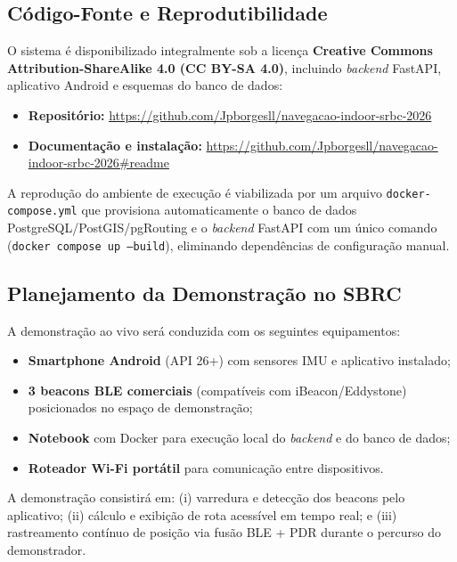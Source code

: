 \documentclass[12pt]{article}
\begin{document}
\subsection{Código-Fonte e Reprodutibilidade}

O sistema é disponibilizado integralmente sob a licença
\textbf{Creative Commons Attribution-ShareAlike 4.0 (CC BY-SA 4.0)},
incluindo \textit{backend} FastAPI, aplicativo Android e esquemas do banco de dados:

\begin{itemize}
  \item \textbf{Repositório:}
        \url{https://github.com/Jpborgesll/navegacao-indoor-srbc-2026}
  \item \textbf{Documentação e instalação:}
        \url{https://github.com/Jpborgesll/navegacao-indoor-srbc-2026#readme}
\end{itemize}

A reprodução do ambiente de execução é viabilizada por um arquivo
\texttt{docker-compose.yml} que provisiona automaticamente o banco de dados
PostgreSQL/PostGIS/pgRouting e o \textit{backend} FastAPI com um único comando
(\texttt{docker compose up --build}), eliminando dependências de configuração manual.

\subsection{Planejamento da Demonstração no SBRC}

A demonstração ao vivo será conduzida com os seguintes equipamentos:

\begin{itemize}
  \item \textbf{Smartphone Android} (API 26+) com sensores IMU e aplicativo instalado;
  \item \textbf{3 beacons BLE comerciais} (compatíveis com iBeacon/Eddystone)
        posicionados no espaço de demonstração;
  \item \textbf{Notebook} com Docker para execução local do \textit{backend} e
        do banco de dados;
  \item \textbf{Roteador Wi-Fi portátil} para comunicação entre dispositivos.
\end{itemize}

A demonstração consistirá em: (i) varredura e detecção dos beacons pelo aplicativo;
(ii) cálculo e exibição de rota acessível em tempo real; e (iii) rastreamento
contínuo de posição via fusão BLE + PDR durante o percurso do demonstrador.
\end{document}
